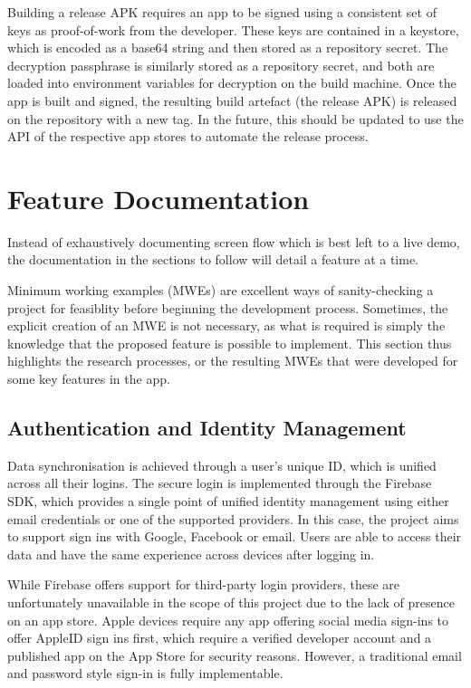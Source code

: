 Building a release APK requires an app to be signed using a consistent set of keys as proof-of-work from the developer. These keys are contained in a keystore, which is encoded as a base64 string and then stored as a repository secret. The decryption passphrase is similarly stored as a repository secret, and both are loaded into environment variables for decryption on the build machine. Once the app is built and signed, the resulting build artefact (the release APK) is released on the repository with a new tag. In the future, this should be updated to use the API of the respective app stores to automate the release process.

\section{Feature Documentation}
Instead of exhaustively documenting screen flow which is best left to a live demo, the documentation in the sections to follow will detail a feature at a time.

Minimum working examples (MWEs) are excellent ways of sanity-checking a project for feasiblity before beginning the development process. Sometimes, the explicit creation of an MWE is not necessary, as what is required is simply the knowledge that the proposed feature is possible to implement. This section thus highlights the research processes, or the resulting MWEs that were developed for some key features in the app.

\subsection{Authentication and Identity Management}
Data synchronisation is achieved through a user's unique ID, which is unified across all their logins. The secure login is implemented through the Firebase SDK, which provides a single point of unified identity management using either email credentials or one of the supported providers. In this case, the project aims to support sign ins with Google, Facebook or email. Users are able to access their data and have the same experience across devices after logging in.

While Firebase offers support for third-party login providers, these are unfortunately unavailable in the scope of this project due to the lack of presence on an app store. Apple devices require any app offering social media sign-ins to offer AppleID sign ins first, which require a verified developer account and a published app on the App Store for security reasons. However, a traditional email and password style sign-in is fully implementable.

